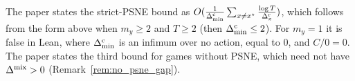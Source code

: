 \begin{remark}
  \label{rem:tsallis_statement}
  The paper states the strict-PSNE bound as $O(\frac{1}{\Delta^{\mathrm{c}}_{\min}}\sum_{x \ne x^\star}
  \frac{\log T}{\Delta^{\mathrm{r}}_x})$, which follows from the form above when $m_y \ge 2$ and $T \ge 2$ (then
  $\Delta^{\mathrm{c}}_{\min} \le 2$). For $m_y = 1$ it is false in Lean, where $\Delta^{\mathrm{c}}_{\min}$ is an infimum over no action,
  equal to $0$, and $C/0 = 0$. The paper states the third bound for games without PSNE, which need
  not have $\Delta^{\mathrm{mix}} > 0$ (Remark~\ref{rem:no_psne_gap}).
\end{remark}
